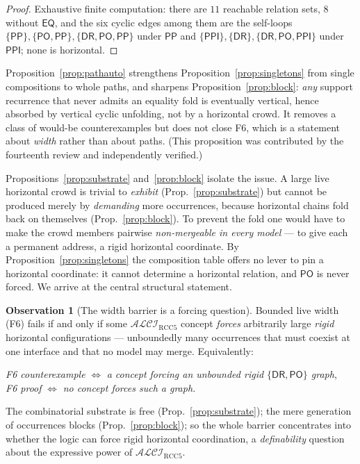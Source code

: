 \documentclass[11pt]{article}
\newcommand{\ALCIRCC}{\mathcal{ALCI}_{\mathrm{RCC5}}}
\newcommand{\DR}{\mathsf{DR}}
\newcommand{\PO}{\mathsf{PO}}
\newcommand{\PP}{\mathsf{PP}}
\newcommand{\PPI}{\mathsf{PPI}}
\newcommand{\EQ}{\mathsf{EQ}}
\theoremstyle{plain}
\theoremstyle{definition}
\newtheorem{observation}[theorem]{Observation}
\begin{document}
\begin{proof}
Exhaustive finite computation: there are $11$ reachable relation sets,
$8$ without $\EQ$, and the six cyclic edges among them are the
self-loops $\{\PP\},\{\PO,\PP\},\{\DR,\PO,\PP\}$ under $\PP$ and
$\{\PPI\},\{\DR\},\{\DR,\PO,\PPI\}$ under $\PPI$; none is horizontal.
\end{proof}

Proposition~\ref{prop:pathauto} strengthens
Proposition~\ref{prop:singletons} from single compositions to whole
paths, and sharpens Proposition~\ref{prop:block}: \emph{any} support
recurrence that never admits an equality fold is eventually vertical,
hence absorbed by vertical cyclic unfolding, not by a horizontal crowd.
It removes a class of would-be counterexamples but does not close F6,
which is a statement about \emph{width} rather than about paths. (This
proposition was contributed by the fourteenth review and independently
verified.)

Propositions~\ref{prop:substrate} and~\ref{prop:block} isolate the
issue. A large live horizontal crowd is trivial to \emph{exhibit}
(Prop.~\ref{prop:substrate}) but cannot be produced merely by
\emph{demanding} more occurrences, because horizontal chains fold back
on themselves (Prop.~\ref{prop:block}). To prevent the fold one would
have to make the crowd members pairwise \emph{non-mergeable in every
model} --- to give each a permanent address, a rigid horizontal
coordinate. By Proposition~\ref{prop:singletons} the composition table
offers no lever to pin a horizontal coordinate: it cannot determine a
horizontal relation, and $\PO$ is never forced. We arrive at the central
structural statement.

\begin{observation}[The width barrier is a forcing question]\label{obs:reduction}
Bounded live width (F6) fails if and only if some $\ALCIRCC$ concept
\emph{forces} arbitrarily large \emph{rigid} horizontal configurations
--- unboundedly many occurrences that must coexist at one interface and
that no model may merge. Equivalently:
\begin{center}
\emph{F6 counterexample} $\iff$ \emph{a concept forcing an unbounded
rigid $\{\DR,\PO\}$ graph},\\
\emph{F6 proof} $\iff$ \emph{no concept forces such a graph.}
\end{center}
The combinatorial substrate is free (Prop.~\ref{prop:substrate}); the
mere generation of occurrences blocks (Prop.~\ref{prop:block}); so the
whole barrier concentrates into whether the logic can force rigid
horizontal coordination, a \emph{definability} question about the
expressive power of $\ALCIRCC$.
\end{observation}
\end{document}
